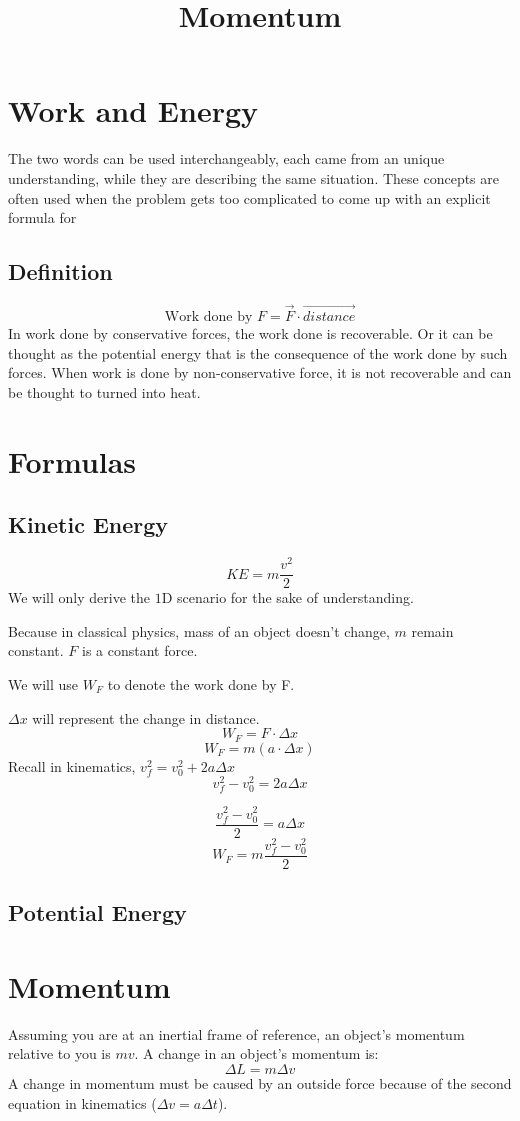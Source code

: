 \documentclass[]{article}
\title{Momentum}
\author{}
\begin{document}
\maketitle
\section{Work and Energy}
The two words can be used interchangeably, each came from an unique understanding, while they are describing the same situation. These concepts are often used when the problem gets too complicated to come up with an explicit formula for  

\subsection{Definition}
	$$\text{Work done by } F = \vec{F} \cdot \vec{distance}$$
	In work done by conservative forces, the work done is recoverable. Or it can be thought as the potential energy that is the consequence of the work done by such forces.
	When work is done by non-conservative force, it is not recoverable and can be thought to turned into heat. 

\section{Formulas}	
	\subsection{Kinetic Energy}
	$$KE = m \frac{v^2}{2}$$
	We will only derive the $1$D scenario for the sake of understanding. 
	
	Because in classical physics, mass of an object doesn't change, $m$ remain constant.
	$F$ is a constant force.
	
	We will use $W_F$ to denote the work done by F.
	
	$\Delta x$ will represent  the change in distance.
	$$W_F = F \cdot \Delta x$$
	$$W_F = m (a \cdot \Delta x)$$
	Recall in kinematics, $v_f^2 = v^2_0 + 2a\Delta x$
	$$v_f^2 - v^2_0 = 2a\Delta x$$
	
	$$\frac{v_f^2 - v^2_0}{2} = a\Delta x$$
	$$W_F = m \frac{v_f^2 - v^2_0}{2}$$
	
	\subsection{Potential Energy}
	
	
\section{Momentum}
Assuming you are at an inertial frame of reference, an object's momentum relative to you is $mv$. A change in an object's momentum is:
$$\Delta L = m \Delta v$$
A change in momentum must be caused by an outside force because of the second equation in kinematics ($\Delta v = a\Delta t$).
\end{document}
